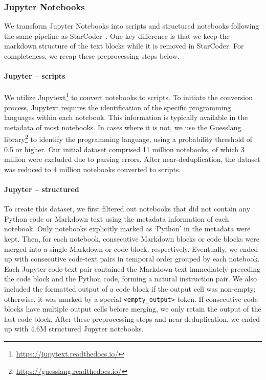 \documentclass[10pt]{article} %
\begin{document}
\subsubsection{Jupyter Notebooks}\label{sec:jupyternotebooks}
We transform Jupyter Notebooks into scripts and structured notebooks following the same pipeline as StarCoder~\citep{li2023starcoder}. One key difference is that we keep the markdown structure of the text blocks while it is removed in StarCoder. For completeness, we recap these preprocessing steps below.  

\paragraph{Jupyter -- scripts} We utilize Jupytext\footnote{\url{https://jupytext.readthedocs.io/}} to convert notebooks to scripts. To initiate the conversion process, Jupytext requires the identification of the specific programming languages within each notebook.  This information is typically available in the metadata of most notebooks. In cases where it is not, we use the Guesslang library\footnote{\url{https://guesslang.readthedocs.io/}} to identify the programming language, using a probability threshold of 0.5 or higher. Our initial dataset comprised 11 million notebooks, of which 3 million were excluded due to parsing errors. After near-deduplication, the dataset was reduced to 4 million notebooks converted to scripts.

\paragraph{Jupyter -- structured} To create this dataset, we first filtered out notebooks that did not contain any Python code or Markdown text using the metadata information of each notebook. Only notebooks explicitly marked as `Python' in the metadata were kept. Then, for each notebook, consecutive Markdown blocks or code blocks were merged into a single Markdown or code block, respectively. Eventually, we ended up with consecutive code-text pairs in temporal order grouped by each notebook. Each Jupyter code-text pair contained the Markdown text immediately preceding the code block and the Python code, forming a natural instruction pair. We also included the formatted output of a code block if the output cell was non-empty; otherwise, it was marked by a special \texttt{<empty\_output>} token. If consecutive code blocks have multiple output cells before merging, we only retain the output of the last code block. After these preprocessing steps and near-deduplication, we ended up with 4.6M structured Jupyter notebooks.
\end{document}
